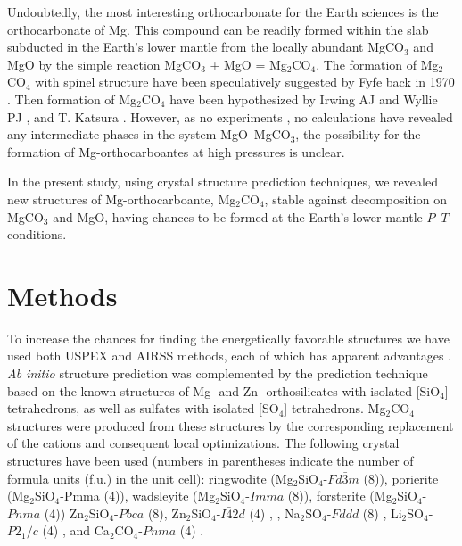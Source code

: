 \documentclass[a4paperm]{article}
\begin{document}
Undoubtedly, the most interesting orthocarbonate for the Earth sciences is the orthocarbonate of Mg. 
This compound can be readily formed within the slab subducted in the Earth's lower mantle from the locally abundant MgCO$_3$ and MgO by the simple reaction MgCO$_3$ + MgO = Mg$_2$CO$_4$.
The formation of Mg$_2$CO$_4$ with spinel structure have been speculatively suggested by Fyfe back in 1970 \cite{fyfe1970}.
Then formation of Mg$_2$CO$_4$ have been hypothesized by Irwing AJ and Wyllie PJ \cite{irving1973}, and T. Katsura \cite{katsura1991_mgco3}.
However, as no experiments \cite{irving1973}, no calculations \cite{yao2018,sugano1980} have revealed any intermediate phases in the system MgO--MgCO$_3$, the possibility for the formation of Mg-orthocarboantes at high pressures is unclear.

In the present study, using crystal structure prediction techniques, we revealed new structures of Mg-orthocarboante, Mg$_2$CO$_4$, stable against decomposition on MgCO$_3$ and MgO, having chances to be formed at the Earth's lower mantle $P$--$T$ conditions.


		\section*{Methods}

To increase the chances for finding the energetically favorable structures we have used both USPEX and AIRSS methods, each of which has apparent advantages \cite{oganov2019}.
{\it Ab initio} structure prediction was complemented by the prediction technique based on the known structures of Mg- and Zn- orthosilicates with isolated [SiO$_4$] tetrahedrons, as well as sulfates with isolated [SO$_4$] tetrahedrons. 
Mg$_2$CO$_4$ structures were produced from these structures by the corresponding replacement of the cations and consequent local optimizations.
The following crystal structures have been used (numbers in parentheses indicate the number of formula units (f.u.) in the unit cell): ringwodite (Mg$_2$SiO$_4$-$Fd\bar{3}m$ (8)),  porierite (Mg$_2$SiO$_4$-Pmma (4)), wadsleyite (Mg$_2$SiO$_4$-$Imma$ (8)), forsterite (Mg$_2$SiO$_4$-$Pnma$ (4)) \cite{smyth1973}
 Zn$_2$SiO$_4$-$Pbca$ (8), Zn$_2$SiO$_4$-$I\bar{4}2d$ (4) \cite{kanzaki2019}, , Na$_2$SO$_4$-$Fddd$ (8) \cite{hawthorne1975}, Li$_2$SO$_4$-$P2_1/c$ (4) \cite{alcock1973}, and Ca$_2$CO$_4$-$Pnma$ (4) \cite{sagatova2020_ortho}.
 
\end{document}
